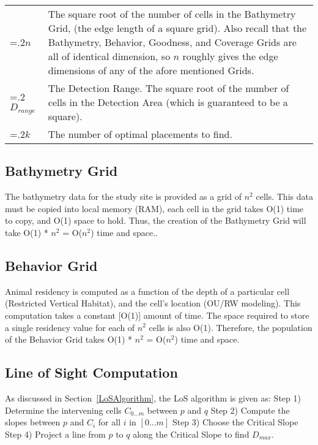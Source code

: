 \noindent\begin{tabularx}{\linewidth}{@{}>{\hsize=.2\hsize}X>{\hsize=1.5\hsize}X@{}}
	$n$
	&
	The square root of the number of cells in the Bathymetry Grid, (the edge length of a square grid).  Also recall that the Bathymetry, Behavior, Goodness, and Coverage Grids are all of identical dimension, so $n$ roughly gives the edge dimensions of any of the afore mentioned Grids.\newline\\
	 $D_{range}$
	 &
	 The Detection Range.  The square root of the number of cells in the Detection Area (which is guaranteed to be a square).\newline\\
	 
	 $k$ 
	 &
	 The number of optimal placements to find.\newline\\
\end{tabularx}



\subsection{Bathymetry Grid}
The bathymetry data for the study site is provided as a grid of $n^2$ cells.  This data must be copied into local memory (RAM), each cell in the grid takes O(1) time to copy, and O(1) space to hold.  Thus, the creation of the Bathymetry Grid will take O(1) * $n^2$ = O($n^2$) time and space..

\subsection{Behavior Grid}
Animal residency is computed as a function of the depth of a particular cell (Restricted Vertical Habitat), and the cell's location (OU/RW modeling).  This computation takes a constant [O(1)] amount of time.  The space required to store a single residency value for each of $n^2$ cells is also O(1).  Therefore, the population of the Behavior Grid takes O(1) * $n^2$ = O($n^2$) time and space.


\subsection{Line of Sight Computation}
\label{bigOLoS}
As discussed in Section~\ref{LoSAlgorithm}, the LoS algorithm is given as:\newline
Step 1) Determine the intervening cells $C_{0...m}$ between $p$ and $q$\newline
Step 2) Compute the slopes between $p$ and $C_i$ for all $i$ in $[0 ... m]$\newline
Step 3) Choose the Critical Slope\newline
Step 4) Project a line from $p$ to $q$ along the Critical Slope to find $D_{max}$.\newline

